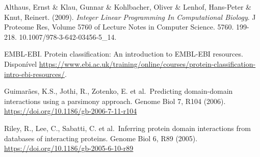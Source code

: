 \documentclass[11pt]{article}
\begin{document}
\begin{thebibliography}{9}

    Althaus, Ernst \& Klau, Gunnar \& Kohlbacher, Oliver \& Lenhof,
    Hans-Peter \& Knut, Reinert. (2009). \emph{Integer Linear Programming In
    Computational Biology}. J Proteome Res, Volume 5760 of Lecture Notes in
    Computer Science. 5760. 199-218. 10.1007/978-3-642-03456-5\_14.

    EMBL-EBI. Protein classification: An introduction to EMBL-EBI
    resources. Disponível
    \href{https://www.ebi.ac.uk/training/online/courses/protein-classification-intro-ebi-resources/}{https://www.ebi.ac.uk/training/online/courses/protein-classification-intro-ebi-resources/}.

    Guimarães, K.S., Jothi, R., Zotenko, E. et al.~Predicting
    domain-domain interactions using a parsimony approach. Genome Biol 7,
    R104 (2006). \href{https://doi.org/10.1186/gb-2006-7-11-r104}{https://doi.org/10.1186/gb-2006-7-11-r104}

    Riley, R., Lee, C., Sabatti, C. et al.~Inferring protein domain
    interactions from databases of interacting proteins. Genome Biol 6, R89
    (2005). \href{https://doi.org/10.1186/gb-2005-6-10-r89}{https://doi.org/10.1186/gb-2005-6-10-r89}

\end{thebibliography}
    
\end{document}

